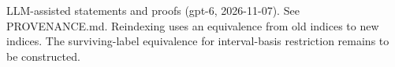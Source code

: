 \documentclass[11pt]{article}
\begin{document}

\bigskip
{\footnotesize LLM-assisted statements and proofs (gpt-6, 2026-11-07).
See PROVENANCE.md. Reindexing uses an equivalence from old indices to new indices.
The surviving-label equivalence for interval-basis restriction remains to be constructed.}
\end{document}
